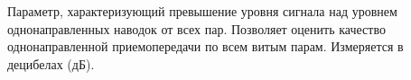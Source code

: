 Параметр, характеризующий превышение уровня сигнала над 
уровнем однонаправленных наводок от всех пар. Позволяет 
оценить качество однонаправленной
приемопередачи по всем витым парам. Измеряется в децибелах (дБ).